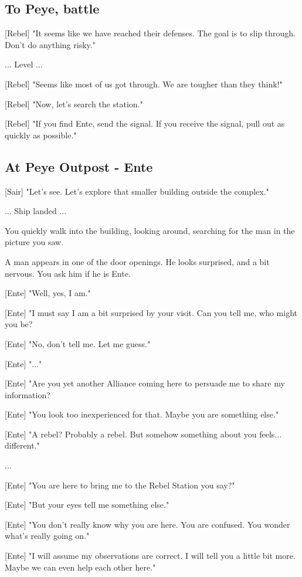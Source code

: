 \documentclass[a4paper,12pt]{article}
\begin{document}
\subsection{To Peye, battle}

[Rebel] "It seems like we have reached their defenses. The goal is to slip through. Don't do anything risky."

... Level ...

[Rebel] "Seems like most of us got through. We are tougher than they think!" 

[Rebel] "Now, let's search the station."

[Rebel] "If you find Ente, send the signal. If you receive the signal, pull out as quickly as possible."

\subsection{At Peye Outpost - Ente}

[Sair] "Let's see. Let's explore that smaller building outside the complex."

... Ship landed ...

You quickly walk into the building, looking around, searching for the man in the picture you saw.

A man appears in one of the door openings. He looks surprised, and a bit nervous. You ask him if he is Ente.

[Ente] "Well, yes, I am." 

[Ente] "I must say I am a bit surprised by your visit. Can you tell me, who might you be? 

[Ente] "No, don't tell me. Let me guess."

[Ente] "..."

[Ente] "Are you yet another Alliance coming here to persuade me to share my information? 

[Ente] "You look too inexperienced for that. Maybe you are something else." 

[Ente] "A rebel? Probably a rebel. But somehow something about you feels... different."

...

[Ente] "You are here to bring me to the Rebel Station you say?"

[Ente] "But your eyes tell me something else." 

[Ente] "You don't really know why you are here. You are confused. You wonder what's really going on."

[Ente] "I will assume my observations are correct. I will tell you a little bit more. 
Maybe we can even help each other here."
\end{document}
